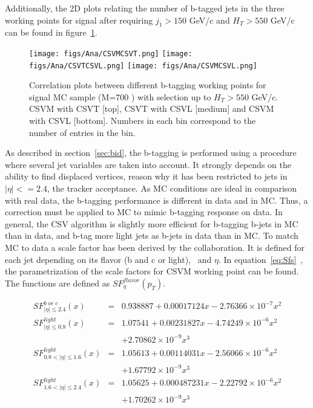 Additionally, the 2D plots relating the number of b-tagged jets in the three working points for signal after requiring $j_{1}>150$ GeV/c and $H_{T}>550$ GeV/c can be found in figure~\ref{fig:WPcorr}.

\begin{figure}[!Hhtbp]
  \begin{center}
    \texttt{[image: figs/Ana/CSVMCSVT.png]}
    \texttt{[image: figs/Ana/CSVTCSVL.png]}
    \texttt{[image: figs/Ana/CSVMCSVL.png]}
    \caption{Correlation plots between different b-tagging working points for signal MC sample (M=700 \GeVcc) with selection up to $H_{T}>550$ GeV/c. CSVM with CSVT [top], CSVT with CSVL [medium] and CSVM with CSVL [bottom]. Numbers in each bin correspond to the number of entries in the bin.}
    \label{fig:WPcorr}
  \end{center}
\end{figure}

As described in section~\ref{sec:bid}, the b-tagging is performed using a procedure where several jet variables are taken into account. It strongly depends on the ability to find displaced vertices, reason why it has been restricted to jets in $|\eta|<=2.4$, the tracker acceptance. As MC conditions are ideal in comparison with real data, the b-tagging performance is different in data and in MC. Thus, a correction must be applied to MC to mimic b-tagging response on data. In general, the CSV algorithm is slightly more efficient for b-tagging b-jets in MC than in data, and b-tag more light jets as b-jets in data than in MC. To match MC to data a scale factor has been derived by the collaboration. It is defined for each jet depending on its flavor (b and c or light), \pt~and $\eta$. In equation~\ref{eq:Sfs}~\cite{CMS:2013vea}, the parametrization of the scale factors for CSVM working point can be found. The functions are defined as $SF^{flavor}_{\eta}(p_{T})$.

\begin{eqnarray}
  \label{eq:Sfs}
  SF^{b\; or\; c}_{|\eta|\le 2.4}(x) & = & 0.938887 + 0.00017124x - 2.76366 \times 10^{-7}x^{2} \nonumber \\
  SF^{light}_{|\eta|\le 0.8}(x) & = & 1.07541 + 0.00231827x - 4.74249 \times 10^{-6}x^{2}  \nonumber \\
  &  & +2.70862 \times 10^{-9}x^{3} \nonumber \\
  SF^{light}_{0.8 < |\eta|\le 1.6}(x) & = & 1.05613 + 0.00114031x - 2.56066 \times 10^{-6}x^{2} \nonumber \\
  &  & + 1.67792 \times 10^{-9}x^{3} \nonumber \\
  SF^{light}_{1.6 < |\eta|\le 2.4}(x) & = & 1.05625 + 0.000487231x - 2.22792 \times 10^{-6}x^{2} \nonumber \\
  &  & + 1.70262 \times 10^{-9}x^{3}
\end{eqnarray}

